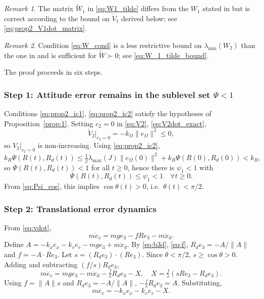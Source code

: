 \documentclass[11pt]{article}
\theoremstyle{remark}
\newtheorem{remark}{Remark}
\newcommand{\lmin}{\lambda_{\min}}
\newcommand{\lmax}{\lambda_{\max}}
\begin{document}
\begin{remark}
\label{rem:W1_tilde}
The matrix $\widetilde W_1$ in \eqref{eq:W1_tilde} differs from the $W_1$ stated in \cite{Lee2010CDC} but is correct according to the bound on $\dot V_1$ derived below; see \eqref{eq:prop2_V1dot_matrix}.
\end{remark}

\begin{remark}
Condition \eqref{eq:W_cond} is a less restrictive bound on $\lmin(W_2)$ than the one in \cite{Lee2010CDC} and is sufficient for $\widetilde W \succ 0$; see \eqref{eq:W_1_tilde_bound}.
\end{remark}

The proof proceeds in six steps.

\subsubsection*{Step 1: Attitude error remains in the sublevel set $\Psi<1$}
Conditions \eqref{eq:prop2_ic1}, \eqref{eq:prop2_ic2} satisfy the hypotheses of Proposition~\ref{prop:1}. Setting $c_2=0$ in \eqref{eq:V2}, \eqref{eq:V2dot_exact},
\[
\dot V_2|_{c_2=0} = -k_\Omega\|e_\Omega\|^2 \le 0,
\]
so $V_2|_{c_2=0}$ is non-increasing. Using \eqref{eq:prop2_ic2},
\[
k_R\Psi(R(t),R_d(t)) \le \tfrac{1}{2}\lmax(J)\|e_\Omega(0)\|^2 + k_R\Psi(R(0),R_d(0)) < k_R,
\]
so $\Psi(R(t),R_d(t)) < 1$ for all $t \ge 0$, hence there is $\psi_1 < 1$ with
\begin{equation}
\Psi(R(t),R_d(t)) \le \psi_1 < 1 \quad \forall t \ge 0.
\label{eq:prop2_Psi_lt_1}
\end{equation}
From \eqref{eq:Psi_cos}, this implies $\cos\theta(t) > 0$, i.e.\ $\theta(t) < \pi/2$.

\subsubsection*{Step 2: Translational error dynamics}
From \eqref{eq:vdot},
\begin{equation}
m\dot e_v = mge_3 - fRe_3 - m\ddot x_d.
\label{eq:prop2_ev_start}
\end{equation}
Define $A = -k_xe_x - k_ve_v - mge_3 + m\ddot x_d$. By \eqref{eq:b3d}, \eqref{eq:f}, $R_de_3 = -A/\|A\|$ and $f = -A\cdot Re_3$. Let $s = (R_de_3)\cdot(Re_3)$. Since $\theta < \pi/2$, $s \ge \cos\theta > 0$. Adding and subtracting $(f/s)R_de_3$,
\begin{equation}
m\dot e_v = mge_3 - m\ddot x_d - \tfrac{f}{s}R_de_3 - X,\quad X = \tfrac{f}{s}(sRe_3 - R_de_3).
\label{eq:prop2_ev_preX}
\end{equation}
Using $f = \|A\|s$ and $R_de_3 = -A/\|A\|$, $-\tfrac{f}{s}R_de_3 = A$. Substituting,
\begin{equation}
m\dot e_v = -k_xe_x - k_ve_v - X.
\label{eq:prop2_ev_dynamics}
\end{equation}
\end{document}
